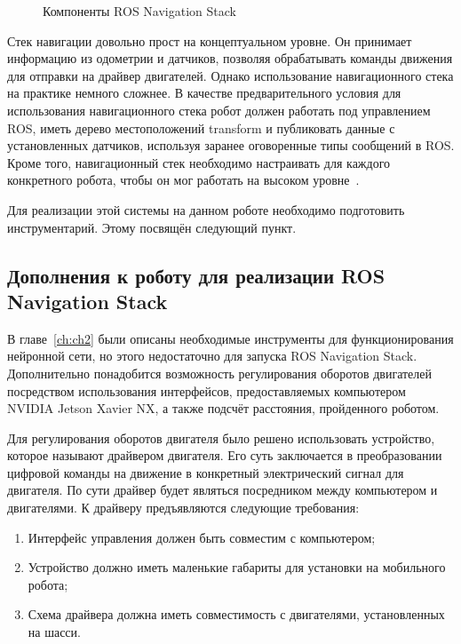 \begin{figure}[ht]
    \caption{Компоненты ROS Navigation Stack}\label{fig:nav-stack}
\end{figure}

Стек навигации довольно прост на концептуальном уровне. Он принимает информацию из одометрии и датчиков, позволяя обрабатывать команды движения для отправки на драйвер двигателей. Однако использование навигационного стека на практике немного сложнее. В качестве предварительного условия для использования навигационного стека робот должен работать под управлением ROS, иметь дерево местоположений transform и публиковать данные с установленных датчиков, используя заранее оговоренные типы сообщений в ROS. Кроме того, навигационный стек необходимо настраивать для каждого конкретного робота, чтобы он мог работать на высоком уровне~\cite{nav-stack}.

Для реализации этой системы на данном роботе необходимо подготовить инструментарий. Этому посвящён следующий пункт.

\subsection{Дополнения к роботу для реализации ROS Navigation Stack}
В главе~\cref{ch:ch2} были описаны необходимые инструменты для функционирования нейронной сети, но этого недостаточно для запуска ROS Navigation Stack. Дополнительно понадобится возможность регулирования оборотов двигателей посредством использования интерфейсов, предоставляемых компьютером NVIDIA Jetson Xavier NX, а также подсчёт расстояния, пройденного роботом. 

Для регулирования оборотов двигателя было решено использовать устройство, которое называют драйвером двигателя. Его суть заключается в преобразовании цифровой команды на движение в конкретный электрический сигнал для двигателя. По сути драйвер будет являться посредником между компьютером и двигателями. К драйверу предъявляются следующие требования:

\begin{enumerate}[beginpenalty=10000] %
  \item Интерфейс управления должен быть совместим с компьютером;
  \item Устройство должно иметь маленькие габариты для установки на мобильного робота;
  \item Схема драйвера должна иметь совместимость с двигателями, установленных на шасси.
\end{enumerate}

